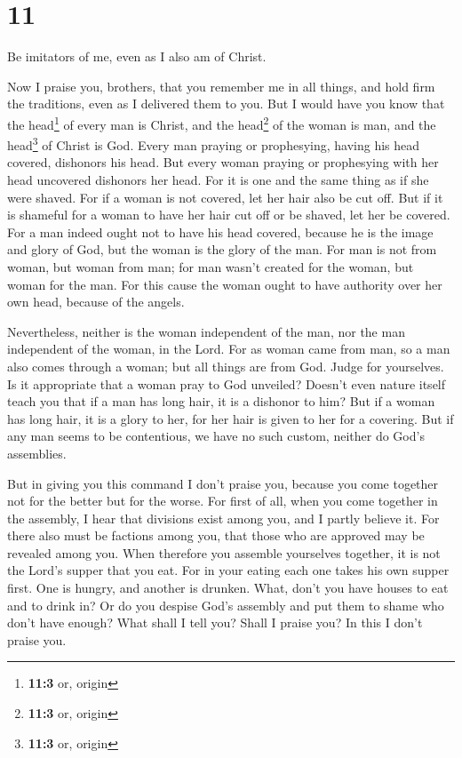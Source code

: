 \hypertarget{section-10}{%
\section{11}\label{section-10}}

 Be imitators of me, even as I also am of Christ.

 Now I praise you, brothers, that you remember me in all
things, and hold firm the traditions, even as I delivered them to you.
 But I would have you know that the head\footnote{\textbf{11:3}
  or, origin} of every man is Christ, and the head\footnote{\textbf{11:3}
  or, origin} of the woman is man, and the head\footnote{\textbf{11:3}
  or, origin} of Christ is God.  Every man praying or
prophesying, having his head covered, dishonors his head. 
But every woman praying or prophesying with her head uncovered dishonors
her head. For it is one and the same thing as if she were shaved.
 For if a woman is not covered, let her hair also be cut
off. But if it is shameful for a woman to have her hair cut off or be
shaved, let her be covered.  For a man indeed ought not to
have his head covered, because he is the image and glory of God, but the
woman is the glory of the man.  For man is not from woman,
but woman from man;  for man wasn't created for the woman,
but woman for the man.  For this cause the woman ought to
have authority over her own head, because of the angels.

 Nevertheless, neither is the woman independent of the
man, nor the man independent of the woman, in the Lord. 
For as woman came from man, so a man also comes through a woman; but all
things are from God.  Judge for yourselves. Is it
appropriate that a woman pray to God unveiled?  Doesn't
even nature itself teach you that if a man has long hair, it is a
dishonor to him?  But if a woman has long hair, it is a
glory to her, for her hair is given to her for a covering.
 But if any man seems to be contentious, we have no such
custom, neither do God's assemblies.

 But in giving you this command I don't praise you,
because you come together not for the better but for the worse.
 For first of all, when you come together in the
assembly, I hear that divisions exist among you, and I partly believe
it.  For there also must be factions among you, that
those who are approved may be revealed among you.  When
therefore you assemble yourselves together, it is not the Lord's supper
that you eat.  For in your eating each one takes his own
supper first. One is hungry, and another is drunken. 
What, don't you have houses to eat and to drink in? Or do you despise
God's assembly and put them to shame who don't have enough? What shall I
tell you? Shall I praise you? In this I don't praise you.

